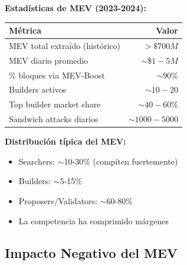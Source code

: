\documentclass[11pt,a4paper,twoside,openright]{book}
\theoremstyle{definition}
\theoremstyle{plain}
\theoremstyle{remark}
\begin{document}
\begin{mathnote}
\textbf{Estadísticas de MEV (2023-2024):}

\begin{center}
\begin{tabular}{lr}
\toprule
\textbf{Métrica} & \textbf{Valor} \\
\midrule
MEV total extraído (histórico) & $>\$700M$ \\
MEV diario promedio & $\sim\$1-5M$ \\
\% bloques via MEV-Boost & $\sim90\%$ \\
Builders activos & $\sim10-20$ \\
Top builder market share & $\sim40-60\%$ \\
Sandwich attacks diarios & $\sim1000-5000$ \\
\bottomrule
\end{tabular}
\end{center}

\textbf{Distribución típica del MEV:}
\begin{itemize}
    \item Searchers: $\sim$10-30\% (compiten fuertemente)
    \item Builders: $\sim$5-15\%
    \item Proposers/Validators: $\sim$60-80\%
    \item La competencia ha comprimido márgenes
\end{itemize}
\end{mathnote}

\subsection{Impacto Negativo del MEV}
\end{document}
